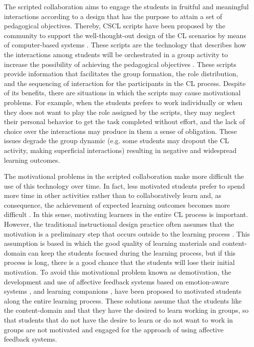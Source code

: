 The scripted collaboration aims to engage the students in fruitful and meaningful interactions according to a design that has the purpose to attain a set of pedagogical objectives.
Thereby, CSCL scripts have been proposed by the community to support the well-thought-out design of the CL scenarios by means of computer-based systems \cite{FischerKollarStegmannWeckerZottmann2013,KobbeWeinbergerDillenbourgHarrerHamalainenHakkinenFischer2007}.
These scripts are the technology that describes how the interactions among students will be orchestrated in a group activity to increase the possibility of achieving the pedagogical objectives \cite{WeinbergerErtlFischerMandl2005}. These scripts provide information that facilitates the group formation, the role distribution, and the sequencing of interaction for the participants in the CL process.
Despite of its benefits, there are situations in which the scripts may cause motivational problems.
For example, when the students prefers to work individually or when they does not want to play the role assigned by the scripts, they may neglect their personal behavior to get the task completed without effort, and the lack of choice over the interactions may produce in them a sense of obligation.
These issues degrade the group dynamic (e.g. some students may dropout the CL activity, making superficial interactions) resulting in negative and widespread learning outcomes.

The motivational problems in the scripted collaboration make more difficult the use of this technology over time.
In fact, less motivated students prefer to spend more time in other activities rather than to collaboratively learn and, as consequence, the achievement of expected learning outcomes becomes more difficult \cite{Crook2000, FaloutElwoodHood2009, SchoorBannert2011}.
In this sense, motivating learners in the entire CL process is important.
However, the traditional instructional design practice often assumes that the motivation is a preliminary step that occurs outside to the learning process \cite{ChanAhern1999, Keller1987}.
This assumption is based in which the good quality of learning materials and content-domain can keep the students focused during the learning process, but if this process is long, there is a good chance that the students will lose their initial motivation.
To avoid this motivational problem known as demotivation, the development and use of affective feedback systems based on emotion-aware systems \cite{FeidakisDaradoumisCaballeConesa2014,FeidakisCaballeDaradoumisJimenezConesa2014}, and learning companions \cite{WoolfBurlesonArroyoDragonCooperPicard2009}, have been proposed to motivated students along the entire learning process.
These solutions assume that the students like the content-domain and that they have the desired to learn working in groups, so that students that do not have the desire to learn or do not want to work in groups are not motivated and engaged for the approach of using affective feedback systems.

